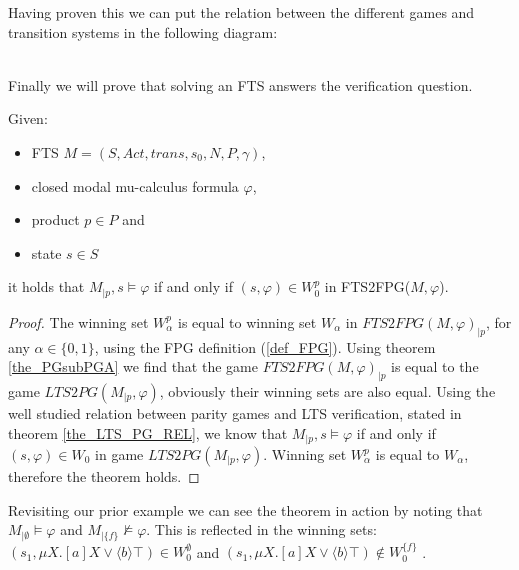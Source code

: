 Having proven this we can put the relation between the different games and transition systems in the following diagram:
\\\\
Finally we will prove that solving an FTS answers the verification question.
\begin{theorem}
	\label{the_FPG_ver_FTS}
	Given:
	\begin{itemize}
		\item FTS $M = (S, Act, trans, s_0, N, P, \gamma)$,
		\item closed modal mu-calculus formula $\varphi$,
		\item product $p \in P$ and
		\item state $s \in S$
	\end{itemize}
	it holds that $M_{|p}, s \models \varphi$ if and only if $(s, \varphi) \in W_0^p$ in FTS2FPG($M, \varphi$).
	\begin{proof}
		The winning set $W_\alpha^p$ is equal to winning set $W_\alpha$ in $FTS2FPG(M, \varphi)_{|p}$, for any $\alpha \in \{0,1\}$, using the FPG definition (\ref{def_FPG}). Using theorem \ref{the_PGsubPGA} we find that the game $FTS2FPG(M, \varphi)_{|p}$ is equal to the game $LTS2PG(M_{|p}, \varphi)$, obviously their winning sets are also equal. Using the well studied relation between parity games and LTS verification, stated in theorem \ref{the_LTS_PG_REL}, we know that $M_{|p}, s \models \varphi$ if and only if $(s, \varphi) \in W_0$ in game $LTS2PG(M_{|p},\varphi)$. Winning set $W_\alpha^p$ is equal to $W_\alpha$, therefore the theorem holds.
	\end{proof}
\end{theorem}

Revisiting our prior example we can see the theorem in action by noting that $M_{|\emptyset} \models \varphi$ and $M_{|\{f\}} \not\models \varphi$. This is reflected in the winning sets: $(s_1, \mu X. [a]X \vee \langle b \rangle \top) \in W_0^\emptyset$ and $(s_1, \mu X. [a]X \vee \langle b \rangle \top) \notin W_0^{\{f\}}$ .